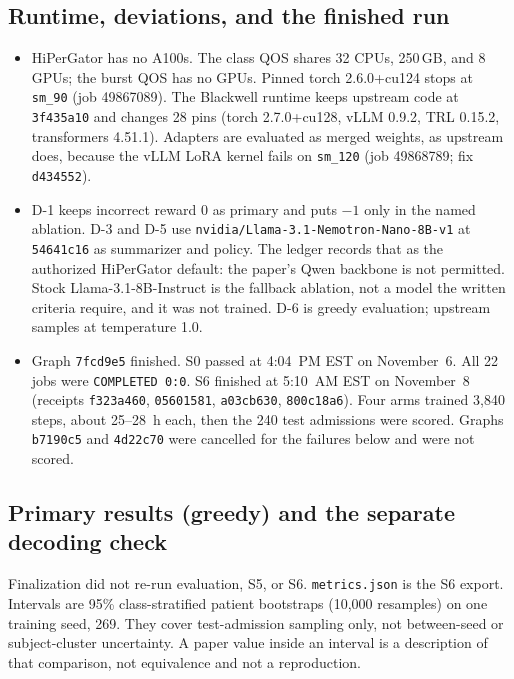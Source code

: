 \documentclass[11pt,letterpaper]{article}
\begin{document}
\subsection{Runtime, deviations, and the finished run}
\begin{itemize}
  \item HiPerGator has no A100s. The class QOS shares 32 CPUs, 250\,GB, and 8 GPUs; the burst QOS has no GPUs. Pinned torch 2.6.0+cu124 stops at \texttt{sm\_90} (job 49867089). The Blackwell runtime keeps upstream code at \texttt{3f435a10} and changes 28 pins (torch 2.7.0+cu128, vLLM 0.9.2, TRL 0.15.2, transformers 4.51.1). Adapters are evaluated as merged weights, as upstream does, because the vLLM LoRA kernel fails on \texttt{sm\_120} (job 49868789; fix \texttt{d434552}).
  \item D-1 keeps incorrect reward 0 as primary and puts $-1$ only in the named ablation. D-3 and D-5 use \texttt{nvidia/}\allowbreak\texttt{Llama-3.1-Nemotron-Nano-8B-v1} at \texttt{54641c16} as summarizer and policy. The ledger records that as the authorized HiPerGator default: the paper's Qwen backbone is not permitted. Stock Llama-3.1-8B-Instruct is the fallback ablation, not a model the written criteria require, and it was not trained. D-6 is greedy evaluation; upstream samples at temperature 1.0.
  \item Graph \texttt{7fcd9e5} finished. S0 passed at 4:04~PM EST on November~6. All 22 jobs were \texttt{COMPLETED 0:0}. S6 finished at 5:10~AM EST on November~8 (receipts \texttt{f323a460}, \texttt{05601581}, \texttt{a03cb630}, \texttt{800c18a6}). Four arms trained 3,840 steps, about 25--28~h each, then the 240 test admissions were scored. Graphs \texttt{b7190c5} and \texttt{4d22c70} were cancelled for the failures below and were not scored.
\end{itemize}

\subsection{Primary results (greedy) and the separate decoding check}
Finalization did not re-run evaluation, S5, or S6. \texttt{metrics.json} is the S6 export. Intervals are 95\% class-stratified patient bootstraps (10,000 resamples) on one training seed, 269. They cover test-admission sampling only, not between-seed or subject-cluster uncertainty. A paper value inside an interval is a description of that comparison, not equivalence and not a reproduction.
\end{document}

